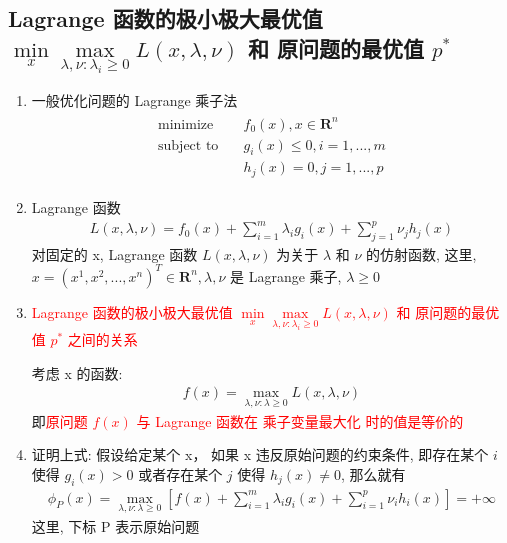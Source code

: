 \documentclass[oneside, 12pt]{ctexbook}
\begin{document}
					
			
			\subsection{ Lagrange 函数的极小极大最优值 $\min\limits_x\max\limits_{\lambda, \nu: \lambda_i \geq 0} L(x, \lambda, \nu)$ 和 原问题的最优值 $p^*$}
				\begin{enumerate}
					\item 一般优化问题的 Lagrange 乘子法
						\begin{align}
							\begin{split}
								\text{minimize} \quad &f_0(x), x \in \boldsymbol{\text{R}}^n \\
								\text{subject to} \quad &g_i(x) \leq 0, i=1,...,m \\
								&h_j(x) = 0, j=1,...,p
							\end{split}
						\end{align}
						
					\item Lagrange 函数
						\begin{align}
							L(x, \lambda, \nu) = f_0(x) + \sum_{i=1}^{m} \lambda_i g_i(x) + \sum_{j=1}^{p} \nu_j h_j(x) \label{eq2: Lagrange_funtion}
						\end{align}
						对固定的 x, Lagrange 函数 $L(x, \lambda, \nu)$ 为关于 $\lambda$ 和 $\nu$ 的仿射函数, 这里, $x = (x^1, x^2, ..., x^n)^T \in \boldsymbol{\text{R}}^n, \lambda, \nu$ 是	Lagrange 乘子, $\lambda \geq 0$
						
					\item \textcolor{red}{Lagrange 函数的极小极大最优值 $\min\limits_x\max\limits_{\lambda, \nu: \lambda_i \geq 0} L(x, \lambda, \nu)$ 和 原问题的最优值 $p^*$ 之间的关系}
					
					考虑 x 的函数: 
						\begin{align}
							f(x) = \max\limits_{\lambda, \nu : \lambda \geq 0} L (x, \lambda, \nu) \label{eq3: Lagrange and original problem}
						\end{align}
					即\textcolor{red}{原问题 $f(x)$ 与 Lagrange 函数在 乘子变量最大化 时的值是等价的}
					
					\item 证明上式:
					假设给定某个 x， 如果 x 违反原始问题的约束条件, 即存在某个 $i$ 使得 $g_i(x) > 0$ 或者存在某个 $j$ 使得 $h_j(x) \neq 0$, 那么就有
						\begin{align}
							\phi_P(x) = \max\limits_{\lambda, \nu : \lambda \geq 0} \left[ f(x) + \sum_{i=1}^{m} \lambda_i g_i(x) + \sum_{i=1}^{p} \nu_i h_i(x) \right] = +\infty
						\end{align}
					这里, 下标 P 表示原始问题
					

\end{enumerate}
\end{document}

